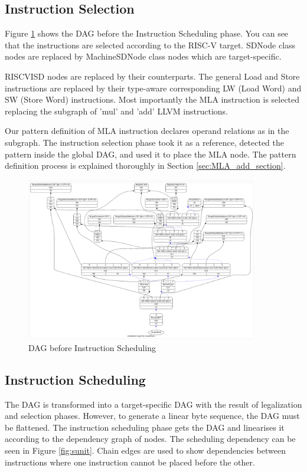\subsection{Instruction Selection}
Figure \ref{fig:dag_sched} shows the DAG before the Instruction Scheduling phase. You can see that the instructions are selected according to the RISC-V target. SDNode class nodes are replaced by MachineSDNode class nodes which are target-specific.
\par
RISCVISD nodes are replaced by their counterparts. The general Load and Store instructions are replaced by their type-aware corresponding LW (Load Word) and SW (Store Word) instructions. Most importantly the MLA instruction is selected replacing the subgraph of 'mul' and 'add' LLVM instructions. 
\par
Our pattern definition of MLA instruction declares operand relations as in the subgraph. The instruction selection phase took it as a reference, detected the pattern inside the global DAG, and used it to place the MLA node. The pattern definition process is explained thoroughly in Section \ref{sec:MLA_add_section}.

\begin{figure}
    \centering
    \includegraphics[width=0.9\textwidth]{path_instruction/madd_dag_sched.png}
    \caption{DAG before Instruction Scheduling}
    \label{fig:dag_sched}
\end{figure}

\subsection{Instruction Scheduling}
The DAG is transformed into a target-specific DAG with the result of legalization and selection phases. However, to generate a linear byte sequence, the DAG must be flattened. The instruction scheduling phase gets the DAG and linearises it according to the dependency graph of nodes. The scheduling dependency can be seen in Figure \ref{fig:sunit}. Chain edges are used to show dependencies between instructions where one instruction cannot be placed before the other.


